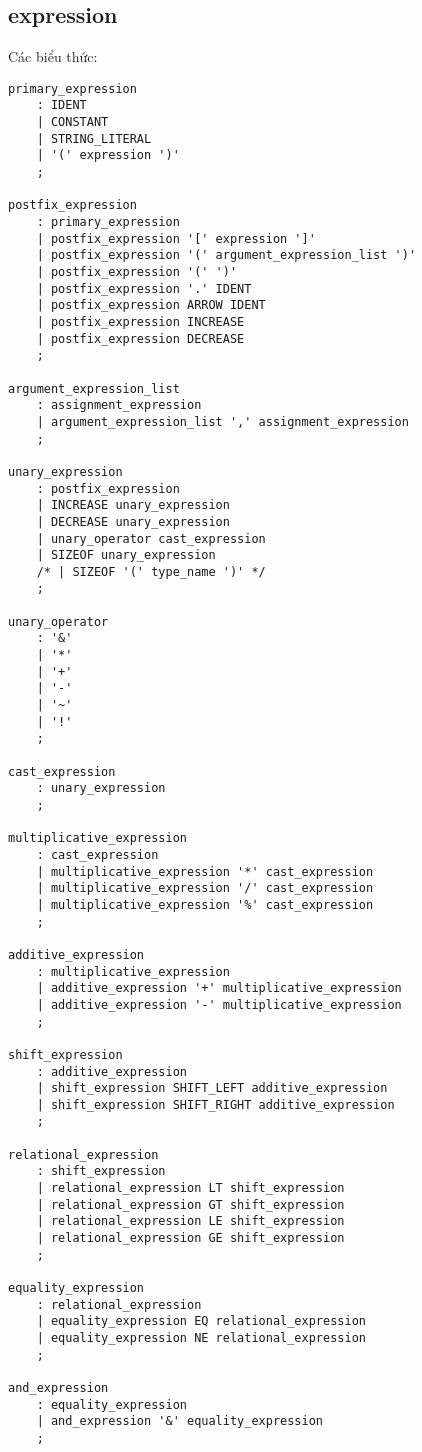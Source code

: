 \documentclass[../report.tex]{subfiles}
\begin{document}
\subsection{expression}
Các biểu thức: 
\begin{lstlisting}
primary_expression
    : IDENT
    | CONSTANT
    | STRING_LITERAL
    | '(' expression ')'
    ;

postfix_expression
    : primary_expression
    | postfix_expression '[' expression ']'
    | postfix_expression '(' argument_expression_list ')'
    | postfix_expression '(' ')'
    | postfix_expression '.' IDENT
    | postfix_expression ARROW IDENT
    | postfix_expression INCREASE
    | postfix_expression DECREASE
    ;

argument_expression_list
    : assignment_expression
    | argument_expression_list ',' assignment_expression
    ;

unary_expression
    : postfix_expression
    | INCREASE unary_expression
    | DECREASE unary_expression
    | unary_operator cast_expression
    | SIZEOF unary_expression
    /* | SIZEOF '(' type_name ')' */
    ;

unary_operator
    : '&'
    | '*'
    | '+'
    | '-'
    | '~'
    | '!'
    ;

cast_expression
    : unary_expression
    ;

multiplicative_expression
    : cast_expression
    | multiplicative_expression '*' cast_expression
    | multiplicative_expression '/' cast_expression
    | multiplicative_expression '%' cast_expression
    ;

additive_expression
    : multiplicative_expression
    | additive_expression '+' multiplicative_expression
    | additive_expression '-' multiplicative_expression
    ;

shift_expression
    : additive_expression
    | shift_expression SHIFT_LEFT additive_expression
    | shift_expression SHIFT_RIGHT additive_expression
    ;

relational_expression
    : shift_expression
    | relational_expression LT shift_expression
    | relational_expression GT shift_expression
    | relational_expression LE shift_expression
    | relational_expression GE shift_expression
    ;

equality_expression
    : relational_expression
    | equality_expression EQ relational_expression
    | equality_expression NE relational_expression
    ;

and_expression
    : equality_expression
    | and_expression '&' equality_expression
    ;


\end{lstlisting}
\end{document}
